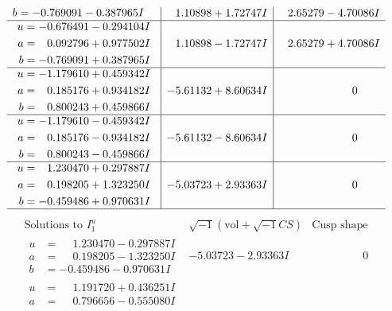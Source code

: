 \documentclass[1p]{elsarticle_modified}
\theoremstyle{definition}
\newcommand{\I}{\sqrt{-1}}
\begin{document}
$$\begin{array}{c|c|c}
\begin{aligned}
b &= -0.769091 - 0.387965 I\end{aligned}
 & \phantom{-}1.10898 + 1.72747 I & \phantom{-}2.65279 - 4.70086 I \\ \hline\begin{aligned}
u &= -0.676491 - 0.294104 I \\
a &= \phantom{-}0.092796 + 0.977502 I \\
b &= -0.769091 + 0.387965 I\end{aligned}
 & \phantom{-}1.10898 - 1.72747 I & \phantom{-}2.65279 + 4.70086 I \\ \hline\begin{aligned}
u &= -1.179610 + 0.459342 I \\
a &= \phantom{-}0.185176 + 0.934182 I \\
b &= \phantom{-}0.800243 + 0.459866 I\end{aligned}
 & -5.61132 + 8.60634 I & \phantom{-0.000000 } 0 \\ \hline\begin{aligned}
u &= -1.179610 - 0.459342 I \\
a &= \phantom{-}0.185176 - 0.934182 I \\
b &= \phantom{-}0.800243 - 0.459866 I\end{aligned}
 & -5.61132 - 8.60634 I & \phantom{-0.000000 } 0 \\ \hline\begin{aligned}
u &= \phantom{-}1.230470 + 0.297887 I \\
a &= \phantom{-}0.198205 + 1.323250 I \\
b &= -0.459486 + 0.970631 I\end{aligned}
 & -5.03723 + 2.93363 I & \phantom{-0.000000 } 0\\
 \hline 
 \end{array}$$\newpage$$\begin{array}{c|c|c}  
\text{Solutions to }I^u_{1}& \I (\text{vol} + \sqrt{-1}CS) & \text{Cusp shape}\\
 \hline 
\begin{aligned}
u &= \phantom{-}1.230470 - 0.297887 I \\
a &= \phantom{-}0.198205 - 1.323250 I \\
b &= -0.459486 - 0.970631 I\end{aligned}
 & -5.03723 - 2.93363 I & \phantom{-0.000000 } 0 \\ \hline\begin{aligned}
u &= \phantom{-}1.191720 + 0.436251 I \\
a &= \phantom{-}0.796656 - 0.555080 I \\

\end{aligned}
\end{array}$$
\end{document}
